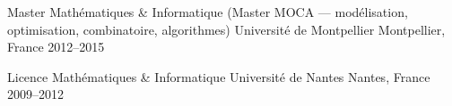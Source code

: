 

\begin{cventries}

  \cventry
    {Master Mathématiques \& Informatique (Master MOCA --- modélisation, optimisation, combinatoire, algorithmes)}
    {Université de Montpellier}
    {Montpellier, France}
    {2012--2015}
    {}

  \cventry
    {Licence Mathématiques \& Informatique}
    {Université de Nantes}
    {Nantes, France}
    {2009--2012}
    {}

\end{cventries}
